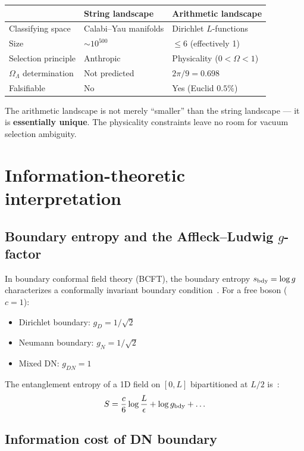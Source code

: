 \documentclass[11pt,a4paper]{article}
\begin{document}
\begin{center}
\begin{tabular}{lll}
\toprule
& String landscape & Arithmetic landscape \\
\midrule
Classifying space & Calabi--Yau manifolds & Dirichlet $L$-functions \\
Size & $\sim 10^{500}$ & $\leq 6$ (effectively 1) \\
Selection principle & Anthropic & Physicality ($0 < \Omega < 1$) \\
$\Omega_\Lambda$ determination & Not predicted & $2\pi/9 = 0.698$ \\
Falsifiable & No & Yes (Euclid $0.5\%$) \\
\bottomrule
\end{tabular}
\end{center}

The arithmetic landscape is not merely ``smaller'' than the string
landscape --- it is \textbf{essentially unique}. The physicality
constraints leave no room for vacuum selection ambiguity.

\section{Information-theoretic interpretation}

\subsection{Boundary entropy and the Affleck--Ludwig $g$-factor}

In boundary conformal field theory (BCFT), the boundary entropy
$s_{\rm bdy} = \log g$ characterizes a conformally invariant
boundary condition~\cite{AffleckLudwig1991}. For a free boson
($c = 1$):

\begin{itemize}
\item Dirichlet boundary: $g_D = 1/\sqrt{2}$
\item Neumann boundary: $g_N = 1/\sqrt{2}$
\item Mixed DN: $g_{DN} = 1$
\end{itemize}

The entanglement entropy of a 1D field on $[0, L]$ bipartitioned at
$L/2$ is~\cite{CalabreseCardy2004}:
\begin{equation}
S = \frac{c}{6}\log\frac{L}{\epsilon} + \log g_{\rm bdy} + \ldots
\end{equation}

\subsection{Information cost of DN boundary}
\end{document}
